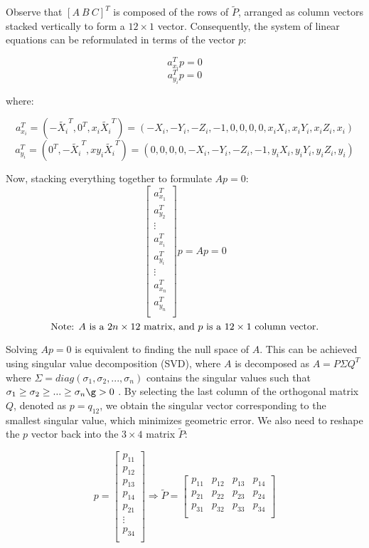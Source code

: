 \documentclass[12pt]{article}
\begin{document}
\noindent Observe that \( [ A \ B \ C ]^T \) is composed of the rows of \( \tilde{P} \), arranged as column vectors stacked vertically to form a \( 12 \times 1 \) vector. Consequently, the system of linear equations can be reformulated in terms of the vector \( p \):

\[ a_{x_i}^T p = 0 \]
\[ a_{y_i}^T p = 0 \]

\noindent where:

\[
a_{x_i}^T = (-\tilde{X_i}^T, 0^T, x_i \tilde{X_i}^T) = (-X_i, -Y_i, -Z_i, -1, 0, 0, 0, 0, x_i X_i, x_i Y_i, x_i Z_i, x_i)
\]
\[
a_{y_i}^T = (0^T, -\tilde{X_i}^T, xy_i \tilde{X_i}^T) = (0, 0, 0, 0, -X_i, -Y_i, -Z_i, -1, y_i X_i, y_i Y_i, y_i Z_i, y_i)
\]

Now, stacking everything together to formulate \( Ap = 0 \):
\[
\begin{bmatrix}
a_{x_1}^T \\
a_{y_2}^T \\
\vdots \\
a_{x_i}^T \\
a_{y_i}^T \\
\vdots \\
a_{x_n}^T \\
a_{y_n}^T \\
\end{bmatrix} p = Ap = 0
\]
\[
\text{Note: \( A \) is a \( 2n \times 12 \) matrix, and \( p \) is a \( 12 \times 1 \) column vector.}
\]

\noindent Solving \( Ap = 0 \) is equivalent to finding the null space of \( A \). This can be achieved using singular value decomposition (SVD), where \( A \) is decomposed as \( A = P \Sigma Q^T \) where \( \Sigma = diag(\sigma_1, \sigma_2, ..., \sigma_n) \) contains the singular values such that 
\( \sigma_1 \geq \sigma_2 \geq ... \geq \sigma_n \g > 0 \) . By selecting the last column of the orthogonal matrix \( Q \), denoted as \( p = q_{12} \), we obtain the singular vector corresponding to the smallest singular value, which minimizes geometric error. We also need to reshape the \( p \) vector back into the \( 3 \times 4 \) matrix \( \tilde{P} \): 

\[
p = 
\begin{bmatrix}
p_{11} \\
p_{12} \\
p_{13} \\
p_{14} \\
p_{21} \\
\vdots \\
p_{34} \\
\end{bmatrix} \Longrightarrow
\tilde{P} = 
\begin{bmatrix}
p_{11} & p_{12} & p_{13} & p_{14} \\
p_{21} & p_{22} & p_{23} & p_{24} \\
p_{31} & p_{32} & p_{33} & p_{34} \\
\end{bmatrix}
\]
\end{document}

